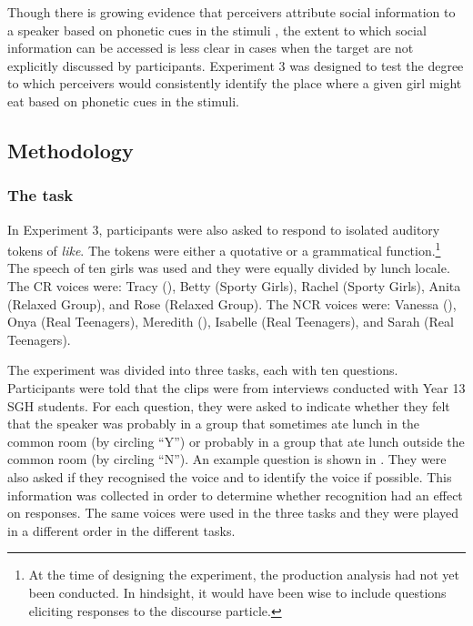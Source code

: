 Though there is growing evidence that perceivers attribute social information to a speaker based on phonetic cues in the stimuli \citep{gilespowesland1975,bayard2000,campbellkibler2007}, the extent to which social information can be accessed is less clear in cases when the target  are not explicitly discussed by participants. Experiment 3 was designed to test the degree to which perceivers would consistently identify the place where a given girl might eat based on phonetic cues in the stimuli.

\subsection{Methodology}

\subsubsection{The task}

In Experiment 3, participants were also asked to respond to isolated auditory tokens of \textit{like}. The tokens were either a quotative or a grammatical function.\footnote{At the time of designing the experiment, the production analysis had not yet been conducted. In hindsight, it would have been wise to include questions eliciting responses to the discourse particle.} The speech of ten girls was used and they were equally divided by lunch locale. The CR voices were: Tracy (), Betty (Sporty Girls), Rachel (Sporty Girls), Anita (Relaxed Group), and Rose (Relaxed Group). The NCR voices were: Vanessa (), Onya (Real Teenagers), Meredith (), Isabelle (Real Teenagers), and Sarah (Real Teenagers). 

The experiment was divided into three tasks, each with ten questions. Participants were told that the clips were from interviews conducted with Year 13 SGH students. For each question, they were asked to indicate whether they felt that the speaker was probably in a group that sometimes ate lunch in the common room (by circling ``Y'') or probably in a group that ate lunch outside the common room (by circling ``N''). An example question is shown in .  They were also asked if they recognised the voice and to identify the voice if possible. This information was collected in order to determine whether recognition had an effect on responses. The same voices were used in the three tasks and they were played in a different order in the different tasks. 

